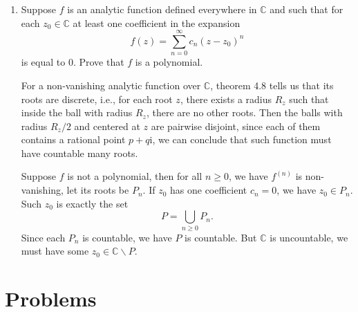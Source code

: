 \documentclass[11pt]{report}
\theoremstyle{mythm}
\let\oldendproof\endproof
\renewenvironment{proof}[1][\proofname]{%
  \oldproof[\normalfont \bfseries #1]%
}{\oldendproof}
\renewcommand*{\proofname}{Proof}
\theoremstyle{myans}
\newtheorem*{answer}{Answer}
\newcommand{\mi}{\mathrm{i}}
\newcommand{\me}{\mathrm{e}}
\newcommand{\dd}{\mathop{}\!\mathrm{d}}
\newcommand{\bbC}{\mathbb{C}}
\begin{document}
\begin{enumerate}
\begin{answer}
\begin{align*}
      &= \mi \int_0^{2\pi} \cos \theta \me^{\mi \theta}\dd \theta\\
      &= \mi \pi.
    \end{align*}
    So such $f(z)$ cannot be uniformly approximated by holomorphic functions.
  \end{answer}
  \setcounter{enumi}{12}
  \item Suppose $f$ is an analytic function defined everywhere in $\bbC$ and such that for each
  $z_0 \in \bbC$ at least one coefficient in the expansion
  \[ f(z) = \sum_{n=0}^\infty c_n (z-z_0)^n \]
  is equal to $0$. Prove that $f$ is a polynomial.
  \begin{proof}
    For a non-vanishing analytic function over $\bbC$, theorem 4.8 tells us that its roots are discrete,
    i.e., for each root $z$, there exists a radius $R_z$ such that inside the ball with radius $R_z$,
    there are no other roots. Then the balls with radius $R_z/2$ and centered at $z$ are pairwise
    disjoint, since each of them contains a rational point $p + q\mi$, we can conclude that
    such function must have countable many roots.

    Suppose $f$ is not a polynomial, then for all $n\geq 0$, we have $f^{(n)}$ is non-vanishing,
    let its roots be $P_n$. If $z_0$ has one coefficient $c_n=0$, we have $z_0\in P_n$.
    Such $z_0$ is exactly the set
    \[ P = \bigcup_{n\geq 0} P_n. \]
    Since each $P_n$ is countable, we have $P$ is countable. But $\bbC$ is uncountable, we must have
    some $z_0\in \bbC \smallsetminus P$.
  \end{proof}
\end{enumerate}

\section{Problems}
\end{document}
